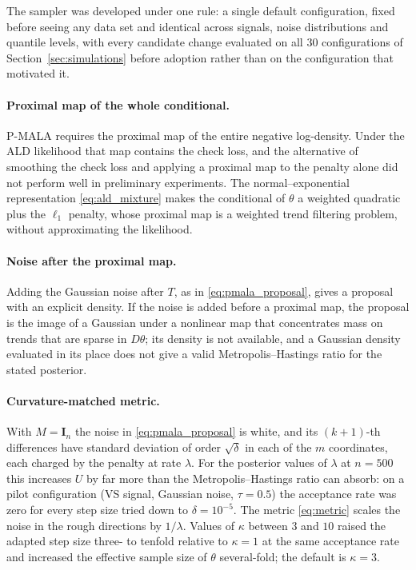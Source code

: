 The sampler was developed under one rule: a single default configuration, fixed before seeing any data set and identical across signals, noise distributions and quantile levels, with every candidate change evaluated on all $30$ configurations of Section~\ref{sec:simulations} before adoption rather than on the configuration that motivated it.

\paragraph{Proximal map of the whole conditional.} P-MALA requires the proximal map of the entire negative log-density. Under the ALD likelihood that map contains the check loss, and the alternative of smoothing the check loss and applying a proximal map to the penalty alone did not perform well in preliminary experiments. The normal--exponential representation \eqref{eq:ald_mixture} makes the conditional of $\theta$ a weighted quadratic plus the $\ell_1$ penalty, whose proximal map is a weighted trend filtering problem, without approximating the likelihood.

\paragraph{Noise after the proximal map.} Adding the Gaussian noise after $T$, as in \eqref{eq:pmala_proposal}, gives a proposal with an explicit density. If the noise is added before a proximal map, the proposal is the image of a Gaussian under a nonlinear map that concentrates mass on trends that are sparse in $D\theta$; its density is not available, and a Gaussian density evaluated in its place does not give a valid Metropolis--Hastings ratio for the stated posterior.

\paragraph{Curvature-matched metric.} With $M = \mathbf{I}_n$ the noise in \eqref{eq:pmala_proposal} is white, and its $(k+1)$-th differences have standard deviation of order $\sqrt{\delta}$ in each of the $m$ coordinates, each charged by the penalty at rate $\lambda$. For the posterior values of $\lambda$ at $n = 500$ this increases $U$ by far more than the Metropolis--Hastings ratio can absorb: on a pilot configuration (VS signal, Gaussian noise, $\tau = 0.5$) the acceptance rate was zero for every step size tried down to $\delta = 10^{-5}$. The metric \eqref{eq:metric} scales the noise in the rough directions by $1/\lambda$. Values of $\kappa$ between $3$ and $10$ raised the adapted step size three- to tenfold relative to $\kappa = 1$ at the same acceptance rate and increased the effective sample size of $\theta$ several-fold; the default is $\kappa = 3$.

